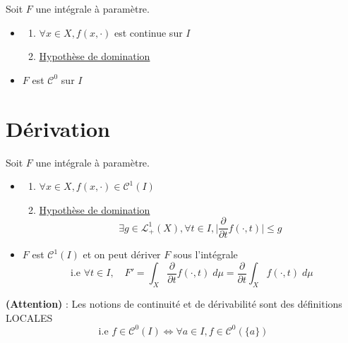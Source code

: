 \newpage

\begin{corollary}
    Soit $F$ une intégrale à paramètre.
    \begin{itemize}
        \item[\textbf{si}]  \begin{enumerate}
                                \item $ \forall x \in X, f(x, \cdot)$ est continue sur $I$
                                \item \underline{Hypothèse de domination}
                            \end{enumerate}
        \item[\textbf{alors}] $F$ est $\mathcal{C}^0$ sur $I$
    \end{itemize}
\end{corollary}

\section{Dérivation}

\begin{theorem}
    Soit $F$ une intégrale à paramètre. 
    \begin{itemize}
        \item[\textbf{si}]  \begin{enumerate}
                                \item $ \forall x \in X, f(x, \cdot) \in \mathcal{C}^1(I)$ 
                                \item \underline{Hypothèse de domination}
                                    \[ \exists g \in \mathcal{L}_+^1(X), \forall t \in I, \Big| \frac{\partial}{\partial t} f(\cdot, t) \Big| \leq g \] 
                            \end{enumerate}
        \item[\textbf{alors}] $F$ est $\mathcal{C}^1(I)$ et on peut dériver $F$ sous l'intégrale 
            \[ \text{i.e } \forall t \in I, \quad F' = \int_X \frac{\partial}{\partial t} f(\cdot, t) \; d \mu = \frac{\partial}{\partial t} \int_X f(\cdot,t) \; d \mu \]
    \end{itemize}
\end{theorem}

\textbf{(Attention)} : Les notions de continuité et de dérivabilité sont des définitions LOCALES
    \[ \text{i.e } f \in \mathcal{C}^0(I) \Longleftrightarrow \forall a \in I, f \in \mathcal{C}^0(\{a\}) \]

